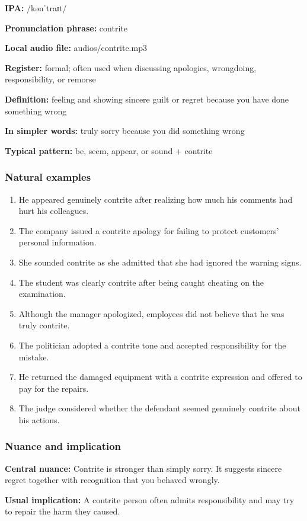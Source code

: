 \documentclass[11pt]{article}
\begin{document}
\textbf{IPA:} /kənˈtraɪt/

\textbf{Pronunciation phrase:} contrite

\textbf{Local audio file:} audios/contrite.mp3

\textbf{Register:} formal; often used when discussing apologies, wrongdoing, responsibility, or remorse

\textbf{Definition:} feeling and showing sincere guilt or regret because you have done something wrong

\textbf{In simpler words:} truly sorry because you did something wrong

\textbf{Typical pattern:} be, seem, appear, or sound + contrite

\subsubsection{Natural examples}
\begin{enumerate}
  \item He appeared genuinely contrite after realizing how much his comments had hurt his colleagues.
  \item The company issued a contrite apology for failing to protect customers' personal information.
  \item She sounded contrite as she admitted that she had ignored the warning signs.
  \item The student was clearly contrite after being caught cheating on the examination.
  \item Although the manager apologized, employees did not believe that he was truly contrite.
  \item The politician adopted a contrite tone and accepted responsibility for the mistake.
  \item He returned the damaged equipment with a contrite expression and offered to pay for the repairs.
  \item The judge considered whether the defendant seemed genuinely contrite about his actions.
\end{enumerate}

\subsubsection{Nuance and implication}
\textbf{Central nuance:} Contrite is stronger than simply sorry. It suggests sincere regret together with recognition that you behaved wrongly.

\textbf{Usual implication:} A contrite person often admits responsibility and may try to repair the harm they caused.
\end{document}
